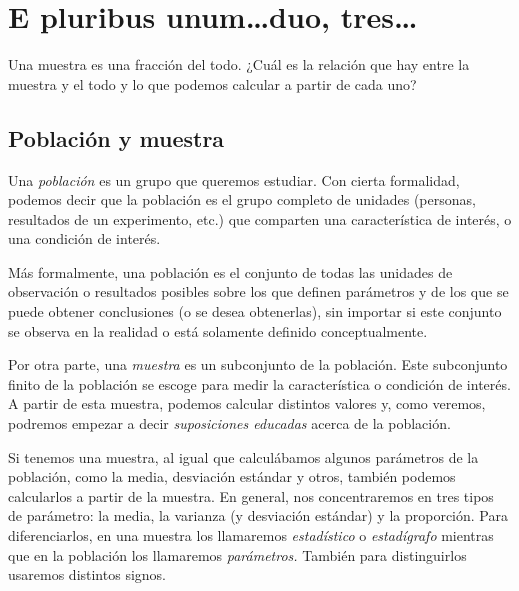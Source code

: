 \chapter{E pluribus unum\ldots duo, tres\ldots}

\begin{ideanote}
Una muestra es una fracción del todo. ¿Cuál es la relación que hay entre la muestra y el todo y lo que podemos calcular a partir de cada uno?
\end{ideanote}

\section{Población y muestra}

Una \emph{población} es un grupo que queremos estudiar. Con cierta formalidad, podemos decir que la población es el grupo completo de unidades (personas, resultados de un experimento, etc.) que comparten una característica de interés, o una condición de interés.

Más formalmente, una población es el conjunto de todas las unidades de observación o resultados posibles sobre los que definen parámetros y de los que se puede obtener conclusiones (o se desea obtenerlas), sin importar si este conjunto se observa en la realidad o está solamente definido conceptualmente. 

Por otra parte, una \emph{muestra} es un subconjunto de la población. Este subconjunto finito de la población se escoge para medir la característica o condición de interés. A partir de esta muestra, podemos calcular distintos valores y, como veremos, podremos empezar a decir \emph{suposiciones educadas} acerca de la población.

Si tenemos una muestra, al igual que calculábamos algunos parámetros de la población, como la media, desviación estándar y otros, también podemos calcularlos a partir de la muestra. En general, nos concentraremos en tres tipos de parámetro: la media, la varianza (y desviación estándar) y la proporción. Para diferenciarlos, en una muestra los llamaremos \emph{estadístico} o \emph{estadígrafo} mientras que en la población los llamaremos \emph{parámetros.} También para distinguirlos usaremos distintos signos.

